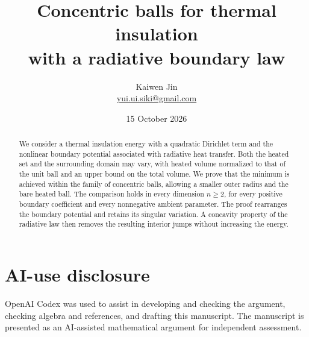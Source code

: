 \documentclass[11pt,a4paper]{article}
\title{Concentric balls for thermal insulation\\with a radiative boundary law}
\author{Kaiwen Jin\\[2pt]\small\href{mailto:yui.ui.siki@gmail.com}{yui.ui.siki@gmail.com}}
\date{15 October 2026}
\theoremstyle{remark}
\numberwithin{equation}{section}
\begin{document}
\maketitle
\begin{abstract}
We consider a thermal insulation energy with a quadratic Dirichlet term
and the nonlinear boundary potential associated with radiative heat
transfer. Both the heated set and the surrounding domain may vary,
with heated volume normalized to that of the unit ball and an upper
bound on the total volume. We prove that the minimum is achieved within the family of
concentric balls, allowing a smaller outer radius and the bare heated
ball. The comparison holds in every dimension \(n\ge2\), for every
positive boundary coefficient and every nonnegative ambient parameter.
The proof rearranges the boundary potential and retains its singular
variation. A concavity property of the radiative law then removes
the resulting interior jumps without increasing the energy.
\end{abstract}




\section*{AI-use disclosure}
OpenAI Codex was used to assist in developing and checking the argument,
checking algebra and references, and drafting this manuscript.
The manuscript is presented as an AI-assisted mathematical argument
for independent assessment.

\end{document}
